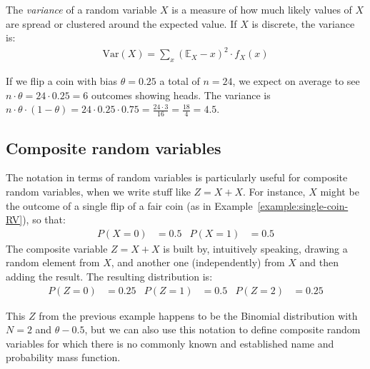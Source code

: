 \documentclass[nobib,nofonts]{tufte-handout}
\renewcommand{\markdef}[1]{\emph{#1}}
\newcommand{\mult}{\ensuremath{\cdot}}
\begin{document}
The \markdef{variance} of a random variable $X$ is a measure of how much likely values of $X$
are spread or clustered around the expected value.
If $X$ is discrete, the variance is:
\begin{align*}
  \text{Var}(X) = \sum_x (\mathds{E}_X - x)^2 \mult f_X(x)
\end{align*}

\begin{example}
  If we flip a coin with bias $\theta = 0.25$ a total of $n=24$, we expect on average to see
  $n \mult \theta = 24 \mult 0.25 = 6$ outcomes showing heads. The variance is
  $n \mult \theta \mult (1-\theta) = 24 \mult 0.25 \mult 0.75 = \frac{24 \mult 3}{16} =
  \frac{18}{4} = 4.5$.
\end{example}

\subsection{Composite random variables}

The notation in terms of random variables is particularly useful for composite random variables, when we write stuff like $Z = X + X$.
For instance, $X$ might be the outcome of a single flip of a fair coin (as in Example~\ref{example:single-coin-RV}), so that:
\begin{align*}
  P(X = 0) & = 0.5 & P(X = 1) & = 0.5
\end{align*}
The composite variable $Z = X + X$ is built by, intuitively speaking, drawing a random element from $X$, and another one (independently) from $X$ and then adding the result.
The resulting distribution is:
\begin{align*}
  P(Z = 0) & = 0.25 & P(Z = 1) & = 0.5 & P(Z = 2) & = 0.25
\end{align*}

This $Z$ from the previous example happens to be the Binomial distribution with $N=2$ and $\theta - 0.5$, but we can also use this notation to define composite random variables for which there is no commonly known and established name and probability mass function.
\end{document}
